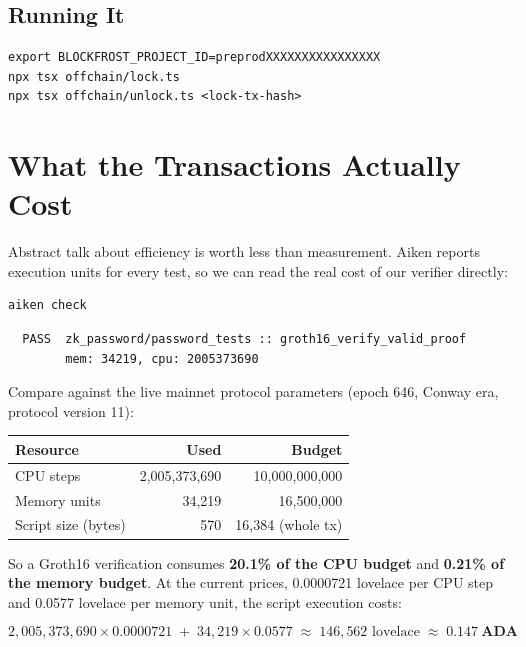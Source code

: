 \subsection*{Running It}

\begin{verbatim}
export BLOCKFROST_PROJECT_ID=preprodXXXXXXXXXXXXXXXX
npx tsx offchain/lock.ts
npx tsx offchain/unlock.ts <lock-tx-hash>
\end{verbatim}

\section{What the Transactions Actually Cost} \label{sec:ch7-cost}

Abstract talk about efficiency is worth less than measurement. Aiken reports
execution units for every test, so we can read the real cost of our verifier
directly:

\begin{verbatim}
aiken check
\end{verbatim}

\begin{verbatim}
  PASS  zk_password/password_tests :: groth16_verify_valid_proof
        mem: 34219, cpu: 2005373690
\end{verbatim}

Compare against the live mainnet protocol parameters (epoch 646, Conway era,
protocol version 11):

\begin{center}
\begin{tabular}{lrr}
  \hline
  \textbf{Resource} & \textbf{Used} & \textbf{Budget} \\
  \hline
  CPU steps            & 2{,}005{,}373{,}690 & 10{,}000{,}000{,}000 \\
  Memory units         & 34{,}219            & 16{,}500{,}000 \\
  Script size (bytes)  & 570                 & 16{,}384 (whole tx) \\
  \hline
\end{tabular}
\end{center}

So a Groth16 verification consumes \textbf{20.1\% of the CPU budget} and
\textbf{0.21\% of the memory budget}. At the current prices, 0.0000721
lovelace per CPU step and 0.0577 lovelace per memory unit, the script
execution costs:

\[
  2{,}005{,}373{,}690 \times 0.0000721 \;+\; 34{,}219 \times 0.0577
  \;\approx\; 146{,}562 \text{ lovelace} \;\approx\; \mathbf{0.147\ ADA}
\]

